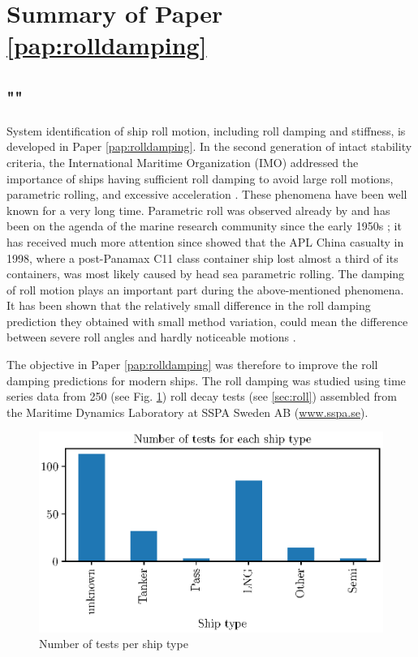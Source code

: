 \section{Summary of Paper \ref{pap:rolldamping}}
\subsection*{""}
System identification of ship roll motion, including roll damping and stiffness, is developed in Paper \ref{pap:rolldamping}. In the second generation of intact stability criteria, the International Maritime Organization (IMO) addressed the importance of ships having sufficient roll damping to avoid large roll motions, parametric rolling, and excessive acceleration \parencite{imo_finalization_2016}. These phenomena have been well known for a very long time. Parametric roll was observed already by \parencite{froude_rolling_1861} and has been on the agenda of the marine research community since the early 1950s \parencite{galeazzi_early_2013}; it has received much more attention since \parencite{france_investigation_2001} showed that the APL China casualty in 1998, where a post-Panamax C11 class container ship lost almost a third of its containers, was most likely caused by head sea parametric rolling. The damping of roll motion plays an important part during the above-mentioned phenomena. It has been shown that the relatively small difference in the roll damping prediction they obtained with small method variation, could mean the difference between severe roll angles and hardly noticeable motions \parencite{soder_ikeda_2019}.

The objective in Paper \ref{pap:rolldamping} was therefore to improve the roll damping predictions for modern ships. The roll damping was studied using time series data from 250 (see Fig. \ref{fig:ship_types}) roll decay tests (see \autoref{sec:roll}) assembled from the Maritime Dynamics Laboratory at SSPA Sweden AB (\href{www.sspa.se}{www.sspa.se}).

\begin{figure}[!htb]
    \centering
    \includegraphics[width=0.5\columnwidth]{kappa/images/ship_types.eps}
    \caption{Number of tests per ship type}
    \label{fig:ship_types}
\end{figure}

